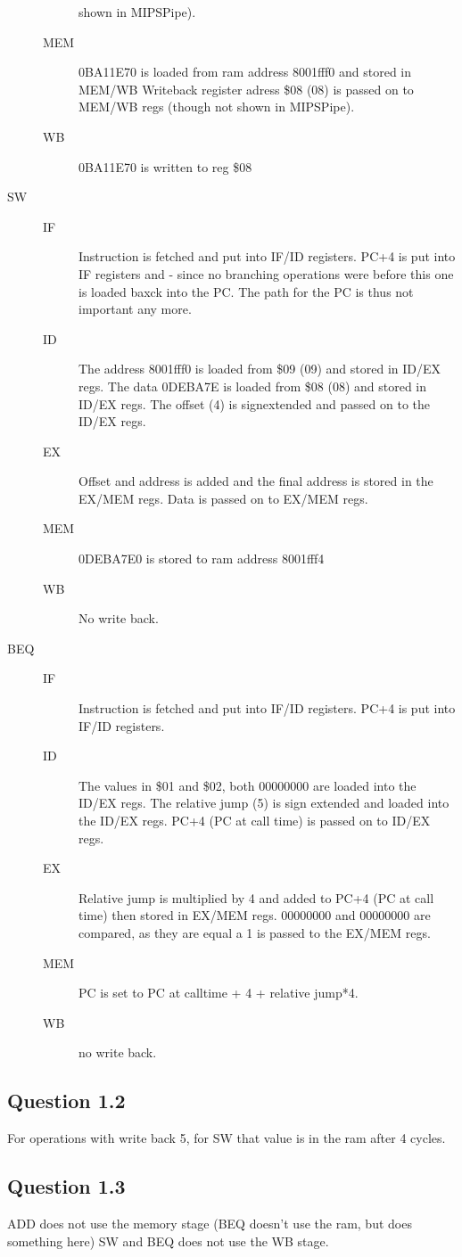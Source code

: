 \begin{description}
\begin{description}
	 shown in MIPSPipe).
	\item[MEM]
	 0BA11E70 is loaded from ram address 8001fff0 and stored in MEM/WB
	 Writeback register adress \$08 (08) is passed on to MEM/WB regs (though not
	 shown in MIPSPipe).
	\item[WB]
	 0BA11E70 is written to reg \$08
	\end{description}
\item[SW]
	\begin{description}
	\item[IF]
	 Instruction is fetched and put into IF/ID registers.
	 PC+4 is put into IF registers and - since no branching operations were before this one is loaded baxck into the PC. The path for the PC is thus not important any more.
	\item[ID]
	 The address 8001fff0 is loaded from \$09 (09) and stored in ID/EX regs.
	 The data 0DEBA7E is loaded from \$08 (08) and stored in ID/EX regs.
	 The offset (4) is signextended and passed on to the ID/EX regs.
	\item[EX]
	 Offset and address is added and the final address is stored in the EX/MEM regs.
	 Data is passed on to EX/MEM regs.
	\item[MEM]
	 0DEBA7E0 is  stored to ram address 8001fff4
	\item[WB]
	 No write back.
	\end{description}
\item[BEQ]
	\begin{description}
	\item[IF]
	 Instruction is fetched and put into IF/ID registers.
	 PC+4 is put into IF/ID registers.
	\item[ID]
	 The values in \$01 and \$02, both 00000000 are loaded into the ID/EX regs.
	 The relative jump (5) is sign extended and loaded into the ID/EX regs.
	 PC+4 (PC at call time) is passed on to ID/EX regs.
	\item[EX]
	 Relative jump is multiplied by 4 and added to PC+4 (PC at call time) then stored in EX/MEM regs.
	 00000000 and 00000000 are compared, as they are equal a 1 is passed to the EX/MEM regs. 
	\item[MEM]
	 PC is set to PC at calltime + 4 + relative jump*4.
	\item[WB]
	 no write back.
	\end{description}
\end{description}

\subsection{Question 1.2}
 For operations with write back 5, for SW that value is in the ram after 4 cycles.

\subsection{Question 1.3}
 ADD does not use the memory stage (BEQ doesn't use the ram, but does something here)
 SW and BEQ does not use the WB stage.